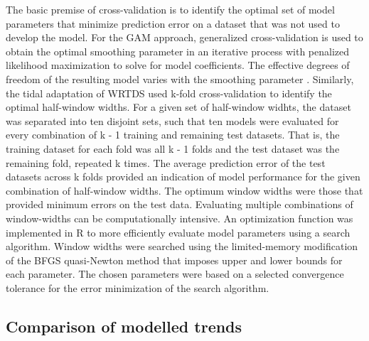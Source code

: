 \documentclass[letterpaper,12pt,oneside]{article}\usepackage[]{graphicx}\usepackage[]{color}
\begin{document}
The basic premise of cross-validation is to identify the optimal set of model parameters that minimize prediction error on a dataset that was not used to develop the model.  For the \ac{GAM} approach, generalized cross-validation is used to obtain the optimal smoothing parameter in an iterative process with penalized likelihood maximization to solve for model coefficients. The effective degrees of freedom of the resulting model varies with the smoothing parameter \citep{Wood06}. Similarly, the tidal adaptation of \ac{WRTDS} used k-fold cross-validation to identify the optimal half-window widths. For a given set of half-window widhts, the dataset was separated into ten disjoint sets, such that ten models were evaluated for every combination of k - 1 training and remaining test datasets. That is, the training dataset for each fold was all k - 1 folds and the test dataset was the remaining fold, repeated k times. The average prediction error of the test datasets across k folds provided an indication of model performance for the given combination of half-window widths.  The optimum window widths were those that provided minimum errors on the test data.  Evaluating multiple combinations of window-widths can be computationally intensive. An optimization function was implemented in R  \citep{Byrd95,RDCT15} to more efficiently evaluate model parameters using a search algorithm.  Window widths were searched using the limited-memory modification of the BFGS quasi-Newton method that imposes upper and lower bounds for each parameter.  The chosen parameters were based on a selected convergence tolerance for the error minimization of the search algorithm.  

\subsection{Comparison of modelled trends}
\end{document}
